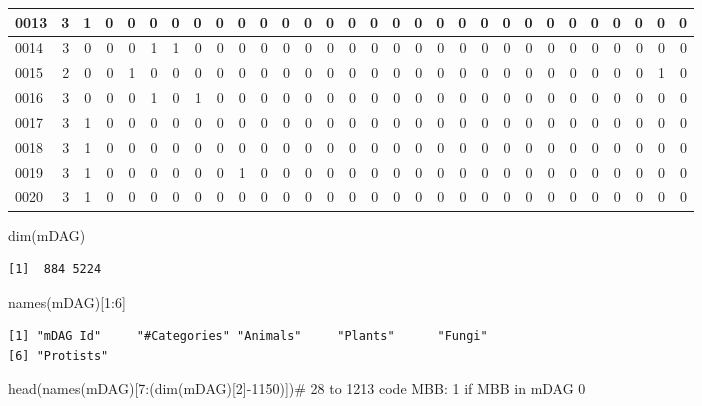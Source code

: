 \documentclass[
  letterpaper,
  DIV=11,
  numbers=noendperiod]{scrreprt}
\newenvironment{Shaded}{\begin{snugshade}}{\end{snugshade}}
\newcommand{\CommentTok}[1]{\textcolor[rgb]{0.37,0.37,0.37}{#1}}
\newcommand{\DecValTok}[1]{\textcolor[rgb]{0.68,0.00,0.00}{#1}}
\newcommand{\FunctionTok}[1]{\textcolor[rgb]{0.28,0.35,0.67}{#1}}
\newcommand{\NormalTok}[1]{\textcolor[rgb]{0.00,0.23,0.31}{#1}}
\newcommand{\SpecialCharTok}[1]{\textcolor[rgb]{0.37,0.37,0.37}{#1}}
\begin{document}
\begin{tabular}{l|r|r|r|r|r|r|r|r|r|r|r|r|r|r|r|r|r|r|r|r|r|r|r|r|r|r|r|r|r}
\hline
0013 & 3 & 1 & 0 & 0 & 0 & 0 & 0 & 0 & 0 & 0 & 0 & 0 & 0 & 0 & 0 & 0 & 0 & 0 & 0 & 0 & 0 & 0 & 0 & 0 & 0 & 0 & 0 & 0 & 0\\
\hline
0014 & 3 & 0 & 0 & 0 & 1 & 1 & 0 & 0 & 0 & 0 & 0 & 0 & 0 & 0 & 0 & 0 & 0 & 0 & 0 & 0 & 0 & 0 & 0 & 0 & 0 & 0 & 0 & 0 & 0\\
\hline
0015 & 2 & 0 & 0 & 1 & 0 & 0 & 0 & 0 & 0 & 0 & 0 & 0 & 0 & 0 & 0 & 0 & 0 & 0 & 0 & 0 & 0 & 0 & 0 & 0 & 0 & 0 & 0 & 1 & 0\\
\hline
0016 & 3 & 0 & 0 & 0 & 1 & 0 & 1 & 0 & 0 & 0 & 0 & 0 & 0 & 0 & 0 & 0 & 0 & 0 & 0 & 0 & 0 & 0 & 0 & 0 & 0 & 0 & 0 & 0 & 0\\
\hline
0017 & 3 & 1 & 0 & 0 & 0 & 0 & 0 & 0 & 0 & 0 & 0 & 0 & 0 & 0 & 0 & 0 & 0 & 0 & 0 & 0 & 0 & 0 & 0 & 0 & 0 & 0 & 0 & 0 & 0\\
\hline
0018 & 3 & 1 & 0 & 0 & 0 & 0 & 0 & 0 & 0 & 0 & 0 & 0 & 0 & 0 & 0 & 0 & 0 & 0 & 0 & 0 & 0 & 0 & 0 & 0 & 0 & 0 & 0 & 0 & 0\\
\hline
0019 & 3 & 1 & 0 & 0 & 0 & 0 & 0 & 0 & 1 & 0 & 0 & 0 & 0 & 0 & 0 & 0 & 0 & 0 & 0 & 0 & 0 & 0 & 0 & 0 & 0 & 0 & 0 & 0 & 0\\
\hline
0020 & 3 & 1 & 0 & 0 & 0 & 0 & 0 & 0 & 0 & 0 & 0 & 0 & 0 & 0 & 0 & 0 & 0 & 0 & 0 & 0 & 0 & 0 & 0 & 0 & 0 & 0 & 0 & 0 & 0\\
\hline
\end{tabular}

\begin{Shaded}
\begin{Highlighting}[]
\FunctionTok{dim}\NormalTok{(mDAG)}
\end{Highlighting}
\end{Shaded}

\begin{verbatim}
[1]  884 5224
\end{verbatim}

\begin{Shaded}
\begin{Highlighting}[]
\FunctionTok{names}\NormalTok{(mDAG)[}\DecValTok{1}\SpecialCharTok{:}\DecValTok{6}\NormalTok{]}
\end{Highlighting}
\end{Shaded}

\begin{verbatim}
[1] "mDAG Id"     "#Categories" "Animals"     "Plants"      "Fungi"      
[6] "Protists"   
\end{verbatim}

\begin{Shaded}
\begin{Highlighting}[]
\FunctionTok{head}\NormalTok{(}\FunctionTok{names}\NormalTok{(mDAG)[}\DecValTok{7}\SpecialCharTok{:}\NormalTok{(}\FunctionTok{dim}\NormalTok{(mDAG)[}\DecValTok{2}\NormalTok{]}\SpecialCharTok{{-}}\DecValTok{1150}\NormalTok{)])}\CommentTok{\# 28 to 1213  code MBB: 1 if MBB in mDAG 0}
\end{Highlighting}
\end{Shaded}
\end{document}
